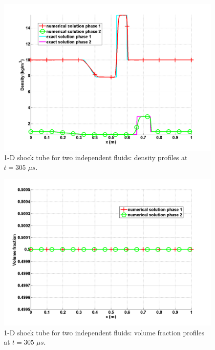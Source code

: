 \begin{figure}[H]
\centering
\includegraphics[width=\textwidth]{figures/SEM/two_phases_density.png}
\caption{1-D shock tube for two independent fluids: density profiles at $t=305$ $\mu s$.}
\label{fig:two-indep-fluids-dens-7-eqn-sect4}
\end{figure}
%
\begin{figure}[H]
\centering
\includegraphics[width=\textwidth]{figures/SEM/two_phases_volume_fraction.png}
\caption{1-D shock tube for two independent fluids: volume fraction profiles at $t=305$ $\mu s$.}
\label{fig:two-indep-fluids-vf-7-eqn-sect4}
\end{figure}
%
